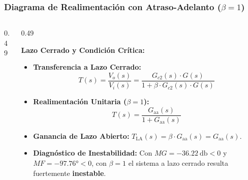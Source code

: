 \begin{frame}
  \frametitle{Diagrama de Realimentación con Atraso-Adelanto ($\beta = 1$)}

  \begin{columns}[c, onlytextwidth]
    \begin{column}{0.49\textwidth}
      \begin{tarjeta}[top=14pt, bottom=14pt]
        \centering
      \end{tarjeta}
    \end{column}

    \begin{column}{0.49\textwidth}
      \begin{tarjeta}[top=6pt, bottom=6pt]
        {\fontsize{8.5pt}{10.5pt}\selectfont \textbf{\color{NavyDark} Lazo Cerrado y Condición Crítica:}}\\[1pt]
        {\fontsize{7.2pt}{9pt}\selectfont
        \begin{itemize}\setlength{\itemsep}{1.5pt}
          \item \textbf{Transferencia a Lazo Cerrado:}
          \[ T(s) = \frac{V_o(s)}{V_i(s)} = \frac{G_{c2}(s) \cdot G(s)}{1 + \beta \cdot G_{c2}(s) \cdot G(s)} \]
          \item \textbf{Realimentación Unitaria ($\beta = 1$):}
          \[ T(s) = \frac{G_{\text{aa}}(s)}{1 + G_{\text{aa}}(s)} \]
          \item \textbf{Ganancia de Lazo Abierto:}
          $T_{\text{LA}}(s) = \beta \cdot G_{\text{aa}}(s) = G_{\text{aa}}(s)$.
          \item \textbf{Diagnóstico de Inestabilidad:}
          Con $MG = \qty{-36.22}{\decibel} < 0$ y $MF = \ang{-97.76} < 0$, con $\beta = 1$ el sistema a lazo cerrado resulta fuertemente \textbf{inestable}.
        \end{itemize}
        }
      \end{tarjeta}
    \end{column}
  \end{columns}
\end{frame}

